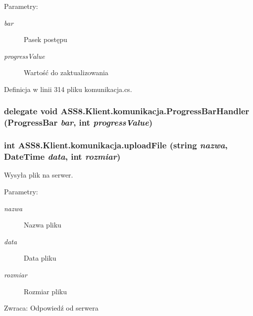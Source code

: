 \begin{Desc}
\item[Parametry:]
\begin{description}
\item[{\em bar}]Pasek postępu\item[{\em progressValue}]Wartość do zaktualizowania\end{description}
\end{Desc}


Definicja w linii 314 pliku komunikacja.cs.\hypertarget{a00013_5500d75da7421c54ebe1ab02e3386709}{
\subsubsection[{ProgressBarHandler}]{\setlength{\rightskip}{0pt plus 5cm}delegate void ASS8.Klient.komunikacja.ProgressBarHandler (ProgressBar {\em bar}, \/  int {\em progressValue})}}
\label{d7/dd4/a00013_5500d75da7421c54ebe1ab02e3386709}


\hypertarget{a00013_9449630c9b6bbf88144aba3981d8eb72}{
\subsubsection[{uploadFile}]{\setlength{\rightskip}{0pt plus 5cm}int ASS8.Klient.komunikacja.uploadFile (string {\em nazwa}, \/  DateTime {\em data}, \/  int {\em rozmiar})}}
\label{d7/dd4/a00013_9449630c9b6bbf88144aba3981d8eb72}


Wysyła plik na serwer. 

\begin{Desc}
\item[Parametry:]
\begin{description}
\item[{\em nazwa}]Nazwa pliku\item[{\em data}]Data pliku\item[{\em rozmiar}]Rozmiar pliku\end{description}
\end{Desc}
\begin{Desc}
\item[Zwraca:]Odpowiedź od serwera\end{Desc}


